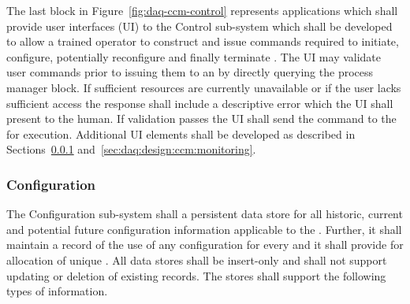 The last block in Figure~\ref{fig:daq-ccm-control} represents applications which shall provide user interfaces (UI) to the Control sub-system which shall be developed to allow a trained operator to construct and issue commands required to initiate, configure, potentially reconfigure and finally terminate . 
The UI may validate user commands prior to issuing them to an  by directly querying the process manager block. 
If sufficient resources are currently unavailable or if the user lacks sufficient access the response shall include a descriptive error which the UI shall present to the human.
If validation passes the UI shall send the command to the  for execution. 
Additional UI elements shall be developed as described in Sections~\ref{sec:daq:design:ccm:configuration} and~\ref{sec:daq:design:ccm:monitoring}.


\subsubsection{Configuration}
\label{sec:daq:design:ccm:configuration}

The  Configuration sub-system shall a persistent data store for all historic, current and potential future configuration information applicable to the .
Further, it shall maintain a record of the use of any configuration for every  and it shall provide for allocation of unique . 
All data stores shall be insert-only and shall not support updating or deletion of existing records.
The stores shall support the following types of information.

